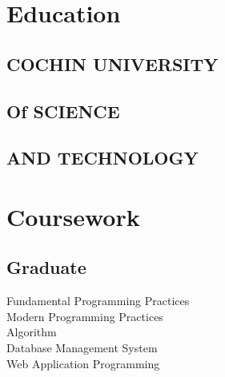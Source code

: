 \documentclass[]{deedy-resume-openfont}
\begin{document}
%
%



%
%

\begin{minipage}[t]{0.33\textwidth} 


\section{Education} 
\subsection{COCHIN UNIVERSITY}
\subsection{Of SCIENCE}
\subsection{AND TECHNOLOGY}
\sectionsep






\section{Coursework}
\subsection{Graduate}
Fundamental Programming Practices \\
Modern Programming Practices \\
Algorithm \\
Database Management System \\
Web Application Programming\\
\sectionsep




\end{minipage}
\end{document}
